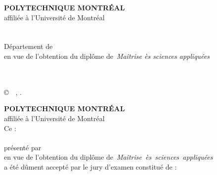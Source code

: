 \documentclass[letterpaper,12pt,oneside,final]{book}
\newcommand\monDipl{Maîtrise ès sciences appliquées}
\newcommand\monDipl{Philosophi\ae{} Doctor}
\begin{document}

\frontmatter
\thispagestyle{empty}%
\begin{center}%
\textbf{POLYTECHNIQUE MONTRÉAL}\\
affiliée à l'Université de Montréal\\
\textbf{\monTitre}\\
\textbf{\MakeUppercase{\monPrenom~\monNom}}\\
Département de~{\monDepartement}\\
 en vue de l'obtention du diplôme de~\emph{\monDipl}\\
\maDiscipline\\
\vskip 0.4in
\moisDepot~\anneeDepot
\end{center}%
\copyright~\monPrenom~\monNom, \anneeDepot.
\newpage\thispagestyle{empty}%
\begin{center}%

\textbf{POLYTECHNIQUE MONTRÉAL}\\
affiliée à l'Université de Montréal\\
Ce :\\
\textbf{\monTitre}\\
présenté
par~\textbf{\mbox{\monPrenom~\MakeUppercase{\monNom}}}\\
en vue de l'obtention du diplôme de~\emph{\mbox{\monDipl}}\\
a été dûment accepté par le jury d'examen constitué de :\end{center}
\monJury
\pagestyle{pagenumber}%
\end{document}
